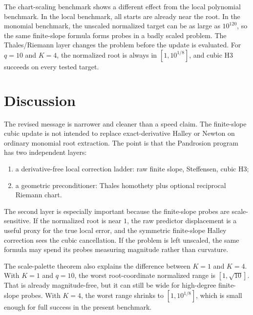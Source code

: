 \documentclass[11pt]{article}
\begin{document}
\begin{table}[htbp]
\centering
\caption{Selected H3 runs.  A dagger means the run did not meet the $10^{-12}$ returned-root tolerance.  The $K=4$ rows show the chosen chart and scale before the final return map.}
\small

\label{tab:examples}
\end{table}

The chart-scaling benchmark shows a different effect from the local polynomial benchmark.  In the local benchmark, all starts are already near the root.  In the monomial benchmark, the unscaled normalized target can be as large as $10^{120}$, so the same finite-slope formula forms probes in a badly scaled problem.  The Thales/Riemann layer changes the problem before the update is evaluated.  For $q=10$ and $K=4$, the normalized root is always in $[1,10^{1/8}]$, and cubic H3 succeeds on every tested target.

\section{Discussion}
The revised message is narrower and cleaner than a speed claim.  The finite-slope cubic update is not intended to replace exact-derivative Halley or Newton on ordinary monomial root extraction.  The point is that the Pandrosion program has two independent layers:
\begin{enumerate}[leftmargin=2.2em]
\item a derivative-free local correction ladder: raw finite slope, Steffensen, cubic H3;
\item a geometric preconditioner: Thales homothety plus optional reciprocal Riemann chart.
\end{enumerate}
The second layer is especially important because the finite-slope probes are scale-sensitive.  If the normalized root is near $1$, the raw predictor displacement is a useful proxy for the true local error, and the symmetric finite-slope Halley correction sees the cubic cancellation.  If the problem is left unscaled, the same formula may spend its probes measuring magnitude rather than curvature.

The scale-palette theorem also explains the difference between $K=1$ and $K=4$.  With $K=1$ and $q=10$, the worst root-coordinate normalized range is $[1,\sqrt{10}]$.  That is already magnitude-free, but it can still be wide for high-degree finite-slope probes.  With $K=4$, the worst range shrinks to $[1,10^{1/8}]$, which is small enough for full success in the present benchmark.
\end{document}
